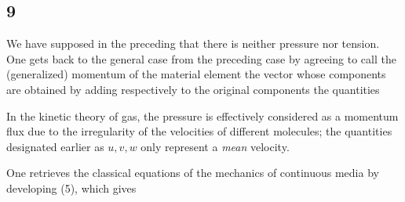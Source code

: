 \subsection*{9}
We have supposed in the preceding that there is neither pressure nor tension. One gets back to the general case from the preceding case by agreeing to call the (generalized) momentum of the material element the vector whose components are obtained by adding respectively to the original components the quantities

In the kinetic theory of gas, the pressure is effectively considered as a momentum flux due to the irregularity of the velocities of different molecules; the quantities designated earlier as $u,v,w$ only represent a \textit{mean} velocity.

One retrieves the classical equations of the mechanics of continuous media by developing (5), which gives
